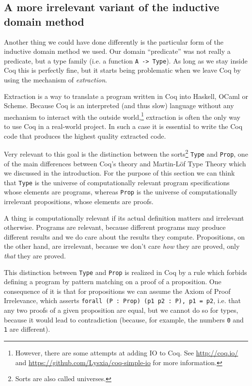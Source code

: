 \documentclass[declaration,mgr,english,shortabstract]{iithesis}
\newcommand{\m}[1]{\texttt{#1}}
\begin{document}
\subsection{A more irrelevant variant of the inductive domain method} \label{irrelevant}

Another thing we could have done differently is the particular form of the inductive domain method we used. Our domain ``predicate'' was not really a predicate, but a type family (i.e. a function \m{A -> Type}). As long as we stay inside Coq this is perfectly fine, but it starts being problematic when we leave Coq by using the mechanism of \textit{extraction}.

Extraction is a way to translate a program written in Coq into Haskell, OCaml or Scheme. Because Coq is an interpreted (and thus slow) language without any mechanism to interact with the outside world,\footnote{However, there are some attempts at adding IO to Coq. See \url{http://coq.io/} and \url{https://github.com/Lysxia/coq-simple-io} for more information.} extraction is often the only way to use Coq in a real-world project. In such a case it is essential to write the Coq code that produces the highest quality extracted code.

Very relevant to this goal is the distinction between the sorts\footnote{Sorts are also called universes.} \m{Type} and \m{Prop}, one of the main differences between Coq's theory and Martin-L\"{o}f Type Theory which we discussed in the introduction. For the purpose of this section we can think that \m{Type} is the universe of computationally relevant program specifications whose elements are programs, whereas \m{Prop} is the universe of computationally irrelevant propositions, whose elements are proofs.

A thing is computationally relevant if its actual definition matters and irrelevant otherwise. Programs are relevant, because different programs may produce different results and we do care about the results they compute. Propositions, on the other hand, are irrelevant, because we don't care \textit{how} they are proved, only \textit{that} they are proved.

This distinction between \m{Type} and \m{Prop} is realized in Coq by a rule which forbids defining a program by pattern matching on a proof of a proposition. One consequence of it is that for propositions we can assume the Axiom of Proof Irrelevance, which asserts \m{forall (P\ :\ Prop) (p1 p2\ :\ P), p1 = p2}, i.e. that any two proofs of a given proposition are equal, but we cannot do so for types, because it would lead to contradiction (because, for example, the numbers \m{0} and \m{1} are different).
\end{document}
